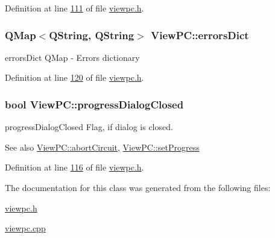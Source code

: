 Definition at line \hyperlink{viewpc_8h_source_l00111}{111} of file \hyperlink{viewpc_8h_source}{viewpc.\+h}.

\subsubsection[{\texorpdfstring{errors\+Dict}{errorsDict}}]{\setlength{\rightskip}{0pt plus 5cm}Q\+Map$<$Q\+String, Q\+String$>$ View\+P\+C\+::errors\+Dict}\hypertarget{class_view_p_c_aaf7f058e5589d65fec72a21abfd5629b}{}\label{class_view_p_c_aaf7f058e5589d65fec72a21abfd5629b}


errors\+Dict Q\+Map -\/ Errors dictionary 



Definition at line \hyperlink{viewpc_8h_source_l00120}{120} of file \hyperlink{viewpc_8h_source}{viewpc.\+h}.

\subsubsection[{\texorpdfstring{progress\+Dialog\+Closed}{progressDialogClosed}}]{\setlength{\rightskip}{0pt plus 5cm}bool View\+P\+C\+::progress\+Dialog\+Closed}\hypertarget{class_view_p_c_add8c82aa2b0b934212aa5bde9277ab36}{}\label{class_view_p_c_add8c82aa2b0b934212aa5bde9277ab36}


progress\+Dialog\+Closed Flag, if dialog is closed. 

\begin{DoxySeeAlso}{See also}
\hyperlink{class_view_p_c_ad7ba2fcf1d17862de15e32432823f7b0}{View\+P\+C\+::abort\+Circuit}, \hyperlink{class_view_p_c_a9c32a1fdb6ead84e5ada8fba8860c7ed}{View\+P\+C\+::set\+Progress} 
\end{DoxySeeAlso}


Definition at line \hyperlink{viewpc_8h_source_l00116}{116} of file \hyperlink{viewpc_8h_source}{viewpc.\+h}.



The documentation for this class was generated from the following files\+:\begin{DoxyCompactItemize}
\item 
\hyperlink{viewpc_8h}{viewpc.\+h}\item 
\hyperlink{viewpc_8cpp}{viewpc.\+cpp}\end{DoxyCompactItemize}
